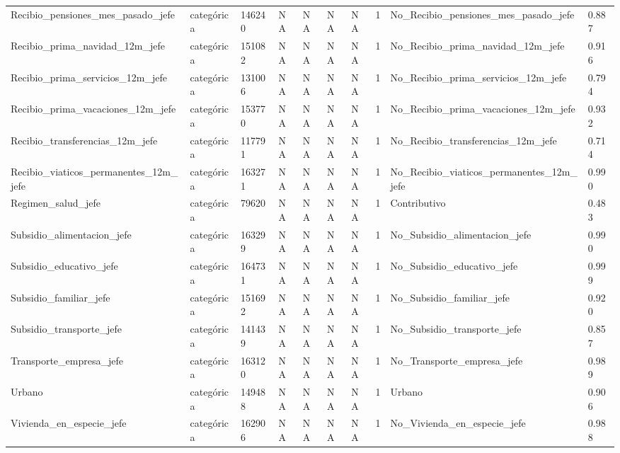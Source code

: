 \begin{longtable}[t]{llllllllll}
Recibio\_pensiones\_mes\_pasado\_jefe & categórica & 146240 & NA & NA & NA & NA & 1 & No\_Recibio\_pensiones\_mes\_pasado\_jefe & 0.887\\
Recibio\_prima\_navidad\_12m\_jefe & categórica & 151082 & NA & NA & NA & NA & 1 & No\_Recibio\_prima\_navidad\_12m\_jefe & 0.916\\
Recibio\_prima\_servicios\_12m\_jefe & categórica & 131006 & NA & NA & NA & NA & 1 & No\_Recibio\_prima\_servicios\_12m\_jefe & 0.794\\
Recibio\_prima\_vacaciones\_12m\_jefe & categórica & 153770 & NA & NA & NA & NA & 1 & No\_Recibio\_prima\_vacaciones\_12m\_jefe & 0.932\\
Recibio\_transferencias\_12m\_jefe & categórica & 117791 & NA & NA & NA & NA & 1 & No\_Recibio\_transferencias\_12m\_jefe & 0.714\\
Recibio\_viaticos\_permanentes\_12m\_jefe & categórica & 163271 & NA & NA & NA & NA & 1 & No\_Recibio\_viaticos\_permanentes\_12m\_jefe & 0.990\\
Regimen\_salud\_jefe & categórica & 79620 & NA & NA & NA & NA & 1 & Contributivo & 0.483\\
Subsidio\_alimentacion\_jefe & categórica & 163299 & NA & NA & NA & NA & 1 & No\_Subsidio\_alimentacion\_jefe & 0.990\\
Subsidio\_educativo\_jefe & categórica & 164731 & NA & NA & NA & NA & 1 & No\_Subsidio\_educativo\_jefe & 0.999\\
Subsidio\_familiar\_jefe & categórica & 151692 & NA & NA & NA & NA & 1 & No\_Subsidio\_familiar\_jefe & 0.920\\
Subsidio\_transporte\_jefe & categórica & 141439 & NA & NA & NA & NA & 1 & No\_Subsidio\_transporte\_jefe & 0.857\\
Transporte\_empresa\_jefe & categórica & 163120 & NA & NA & NA & NA & 1 & No\_Transporte\_empresa\_jefe & 0.989\\
Urbano & categórica & 149488 & NA & NA & NA & NA & 1 & Urbano & 0.906\\
Vivienda\_en\_especie\_jefe & categórica & 162906 & NA & NA & NA & NA & 1 & No\_Vivienda\_en\_especie\_jefe & 0.988\\*
\end{longtable}